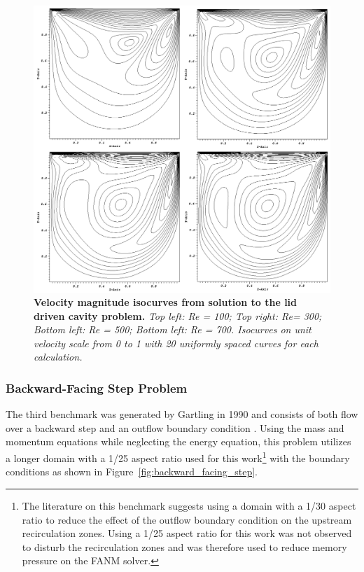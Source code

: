 \begin{figure}[t!]
  \begin{center}
    \includegraphics[width=6in]{chapters/nonlinear_problem/driven_velocity_isocurves.png}
  \end{center}
  \caption{\textbf{Velocity magnitude isocurves from solution to the
      lid driven cavity problem.} \textit{Top left: Re = 100; Top
      right: Re= 300; Bottom left: Re = 500; Bottom left: Re =
      700. Isocurves on unit velocity scale from 0 to 1 with 20
      uniformly spaced curves for each calculation.}}
  \label{fig:driven_velocity_isocurves}
\end{figure}

\clearpage

\subsubsection{Backward-Facing Step Problem}
\label{subsubsec:backward_facing_step}
The third benchmark was generated by Gartling in 1990 and consists of
both flow over a backward step and an outflow boundary condition
\cite{gartling_test_1990}. Using the mass and momentum equations
while neglecting the energy equation, this problem utilizes a longer
domain with a 1/25 aspect ratio used for this work\footnote{The
  literature on this benchmark suggests using a domain with a 1/30
  aspect ratio to reduce the effect of the outflow boundary condition
  on the upstream recirculation zones. Using a 1/25 aspect ratio for
  this work was not observed to disturb the recirculation zones and
  was therefore used to reduce memory pressure on the FANM solver.}
with the boundary conditions as shown in
Figure~\ref{fig:backward_facing_step}.

